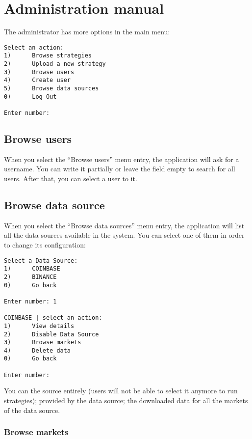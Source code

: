 \section{Administration manual}\label{sec:adminmanual}

The administrator has more options in the main menu:

\begin{verbatim}
Select an action:
1)      Browse strategies
2)      Upload a new strategy
3)      Browse users
4)      Create user
5)      Browse data sources
0)      Log-Out

Enter number:
\end{verbatim}

\subsection{Browse users}

When you select the ``Browse users'' menu entry, the application will ask for a
username. You can write it partially or leave the field empty to search for all
users. After that, you can select a user to  it.

\subsection{Browse data source}

When you select the ``Browse data sources'' menu entry, the application will
list all the data sources available in the system. You can select one of them in
order to change its configuration:

\begin{verbatim}
Select a Data Source: 
1)      COINBASE
2)      BINANCE
0)      Go back

Enter number: 1

COINBASE | select an action:
1)      View details
2)      Disable Data Source
3)      Browse markets
4)      Delete data
0)      Go back

Enter number:
\end{verbatim}

You can  the source entirely (users will not be able to select it anymore
to run strategies);  provided by the data
source;  the downloaded data for all the markets of the data
source.

\subsubsection{Browse markets}

